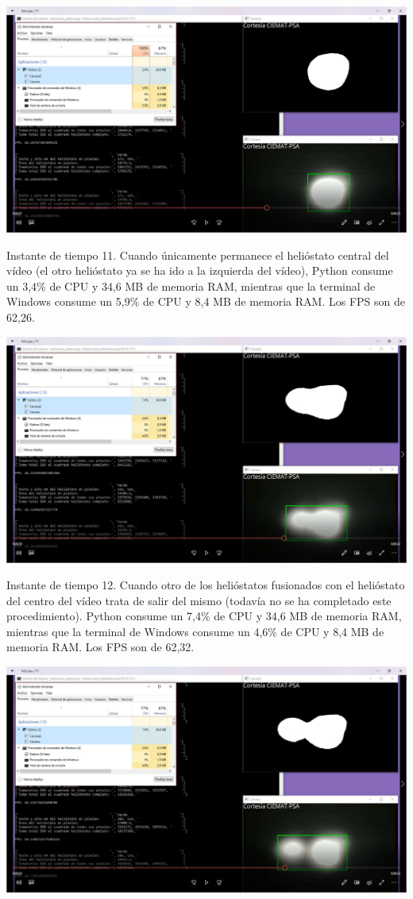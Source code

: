\documentclass[12pt]{article}
\begin{document}
\includegraphics[width=\textwidth]{CapturasRendimientoSoftware1/Imagen11.png}

Instante de tiempo 11. Cuando únicamente permanece el helióstato central del vídeo (el otro helióstato ya se ha ido a la izquierda del vídeo), Python consume un 3,4\% de CPU y 34,6 MB de memoria RAM, mientras que la terminal de Windows consume un 5,9\% de CPU y 8,4 MB de memoria RAM. Los FPS son de 62,26.


\includegraphics[width=\textwidth]{CapturasRendimientoSoftware1/Imagen12.png}

Instante de tiempo 12. Cuando otro de los helióstatos fusionados con el helióstato del centro del vídeo trata de salir del mismo (todavía no se ha completado este procedimiento). Python consume un 7,4\% de CPU y 34,6 MB de memoria RAM, mientras que la terminal de Windows consume un 4,6\% de CPU y 8,4 MB de memoria RAM. Los FPS son de 62,32.


\includegraphics[width=\textwidth]{CapturasRendimientoSoftware1/Imagen13.png}
\end{document}
